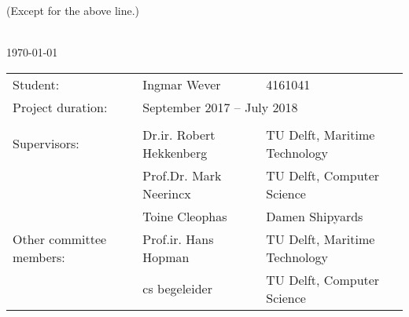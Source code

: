{\begin{center}
		\tiny{(Except for the above line.)}

	\end{center}

	\begin{titlepage}
		\newpage
		\setcounter{page}{0}
		
		\centering
		\Large
		\vspace*{3cm}
		\doctitle\\
		\large
		\vspace{1cm}
		\today
		
		\vspace{7cm}
		\normalsize
		\begin{tabular}{lll}
			Student: & Ingmar Wever & 4161041 \\
			Project duration: & \multicolumn{2}{l}{September 2017 -- July 2018} \\
			& & \\
			Supervisors: & Dr.ir. Robert Hekkenberg & TU Delft, Maritime Technology \\
			& Prof.Dr. Mark Neerincx & TU Delft, Computer Science \\
			& Toine Cleophas & Damen Shipyards \\
			Other committee members: & Prof.ir. Hans Hopman & TU Delft, Maritime Technology \\
			& cs begeleider & TU Delft, Computer Science \\
		\end{tabular}

\end{titlepage}
		
}
	